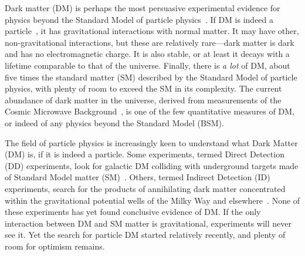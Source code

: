 





Dark matter (DM) is perhaps the most persuasive experimental evidence for physics beyond the Standard Model of particle physics~\cite{Bertone:2016nfn}. 
If DM is indeed a particle~\cite{Steigman:1979kw}, it has gravitational interactions with normal matter.
It may have other, non-gravitational interactions, but these are relatively rare---dark matter is dark and has no electromagnetic charge.
It is also stable, or at least it decays with a lifetime comparable to that of the universe.
Finally, there is {\it a lot} of DM, about five times the standard matter (SM) described by the Standard Model of particle physics, with plenty of room to exceed the SM in its complexity.
The current abundance of dark matter in the universe, derived from measurements of the Cosmic Microwave Background~\cite{Ade:2015xua}, is one of the few quantitative measures of DM, or indeed of any physics beyond the Standard Model (BSM).

The field of particle physics is increasingly keen to understand what Dark Matter (DM) is, if it is indeed a particle. 
Some experiments, termed Direct Detection (DD) experiments, look for galactic DM colliding with underground targets made of Standard Model matter (SM)~\cite{0954-3899-43-1-013001}.
Others, termed Indirect Detection (ID) experiments, search for the products of annihilating dark matter concentrated within the gravitational potential wells of the Milky Way and elsewhere~\cite{Gaskins:2016cha}.
None of these experiments has yet found conclusive evidence of DM.
If the only interaction between DM and SM matter is gravitational, experiments will never see it.
Yet the search for particle DM started relatively recently, and plenty of room for optimism remains.

